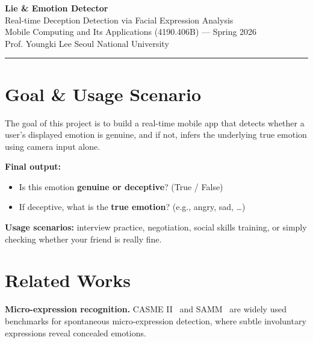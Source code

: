 \documentclass[10pt]{article}
\begin{document}
\begin{center}
  {\LARGE \textbf{Lie \& Emotion Detector}} \\[6pt]
  {\large Real-time Deception Detection via Facial Expression Analysis} \\[10pt]
  {\normalsize Mobile Computing and Its Applications (4190.406B) --- Spring 2026} \\
  {\normalsize Prof. Youngki Lee \quad Seoul National University} \\[6pt]
  \rule{\linewidth}{0.4pt}
\end{center}
\vspace{6pt}

\section{Goal \& Usage Scenario}

The goal of this project is to build a real-time mobile app that detects whether a user's
displayed emotion is genuine, and if not, infers the underlying true emotion using camera
input alone.

\textbf{Final output:}
\begin{itemize}[leftmargin=*, topsep=2pt, itemsep=1pt]
  \item Is this emotion \textbf{genuine or deceptive}? (True / False)
  \item If deceptive, what is the \textbf{true emotion}? (e.g., angry, sad, \ldots)
\end{itemize}

\textbf{Usage scenarios:} interview practice, negotiation, social skills training, or
simply checking whether your friend is really fine.

\section{Related Works}

\textbf{Micro-expression recognition.}
CASME II~\cite{yan2014casme2} and SAMM~\cite{davison2018samm} are widely used benchmarks
for spontaneous micro-expression detection, where subtle involuntary expressions reveal
concealed emotions.
\end{document}
